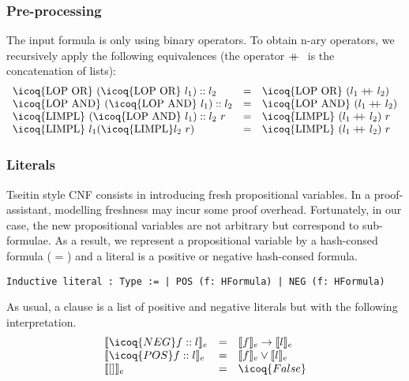 \documentclass[utf8,a4paper,UKenglish,cleveref, autoref, thm-restate]{lipics-v2019}
\newcommand{\mcoq}[1]{\mbox{\icoq{#1}}}
\newcommand\doubleplus{+\kern-1.3ex+\kern0.8ex}
\begin{document}
\subsubsection{Pre-processing}
The input formula is only using binary operators.  To obtain n-ary
operators, we recursively apply the following equivalences (the
operator $\doubleplus$ is the concatenation of lists):
\[
  \begin{array}{lcl}
    \mcoq{LOP OR}\ (\mcoq{LOP OR}\ l_1):: l_2 &=& \mcoq{LOP OR}\ (l_1 \doubleplus l_2)\\
    \mcoq{LOP AND}\ (\mcoq{LOP AND}\ l_1):: l_2 &=& \mcoq{LOP AND}\ (l_1 \doubleplus l_2)\\
    \mcoq{LIMPL}\ (\mcoq{LOP AND}\ l_1):: l_2\  r  &=& \mcoq{LIMPL}\ (l_1 \doubleplus l_2)\ r\\
    \mcoq{LIMPL}\ l_1 (\mcoq{LIMPL} l_2\ r)  &=& \mcoq{LIMPL}\ (l_1 \doubleplus l_2)\ r\\
  \end{array}
\]

\subsubsection{Literals}
Tseitin style CNF consists in introducing fresh
propositional variables.  In a proof-assistant, modelling freshness
may incur some proof overhead. Fortunately, in our case, the new
propositional variables are not arbitrary but correspond to
sub-formulae. As a result, we represent a propositional variable by a
hash-consed formula ( = ) and a
literal is a positive or negative hash-consed formula.
\begin{verbatim}
Inductive literal : Type := | POS (f: HFormula) | NEG (f: HFormula)
\end{verbatim}
As usual, a clause is a list of positive and negative literals but with the following interpretation.
\[
  \begin{array}{lcl}
    \llbracket \icoq{NEG} f :: l \rrbracket_e & = & \llbracket f \rrbracket_e \rightarrow \llbracket l \rrbracket_e \\
    \llbracket \icoq{POS} f :: l \rrbracket_e & = & \llbracket f \rrbracket_e \lor \llbracket l \rrbracket_e \\
    \llbracket [] \rrbracket_e &= & \icoq{False} \\
  \end{array}
\]
\end{document}
